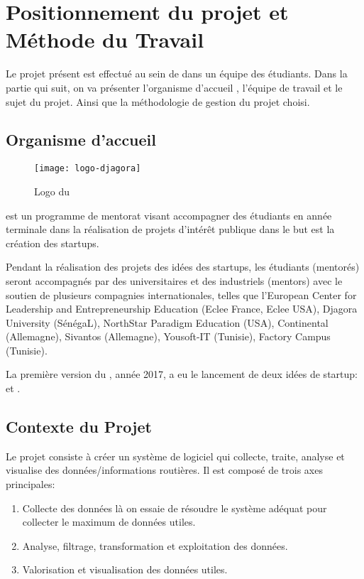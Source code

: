 \chapter{Positionnement du projet et Méthode du Travail}

Le projet présent est effectué au sein de  dans un
équipe des étudiants. Dans la partie qui suit, on va présenter l'organisme
d'accueil , l'équipe de travail et le sujet du
projet. Ainsi que la méthodologie de gestion du projet choisi.

\section{Organisme d'accueil }

\begin{figure}[!h]
    \centering
    \texttt{[image: logo-djagora]}
    \caption{Logo du }
\label{fig:logo-djagora}
\end{figure}

 est un programme de mentorat visant accompagner des
étudiants en année terminale dans la réalisation de projets d'intérêt publique
dans le but est la création des startups.

Pendant la réalisation des projets des idées des startups, les étudiants
(mentorés) seront accompagnés par des universitaires et des industriels
(mentors) avec le soutien de plusieurs compagnies internationales, telles que
l'European Center for Leadership and Entrepreneurship Education (Eclee France,
Eclee USA), Djagora University (SénégaL), NorthStar Paradigm Education (USA),
Continental (Allemagne), Sivantos (Allemagne), Yousoft-IT (Tunisie), Factory
Campus (Tunisie).~\cite{djagora-intro}

La première version du , année 2017, a eu le
lancement de deux idées de startup:  et .

\section{Contexte du Projet}

Le projet  consiste à créer un système de logiciel qui
collecte, traite, analyse et visualise des données/informations routières. Il
est composé de trois axes principales:

\begin{enumerate}
    \item Collecte des données là on essaie de résoudre le système adéquat pour
        collecter le maximum de données utiles.
    \item Analyse, filtrage, transformation et exploitation des données.
    \item Valorisation et visualisation des données utiles.
\end{enumerate}


